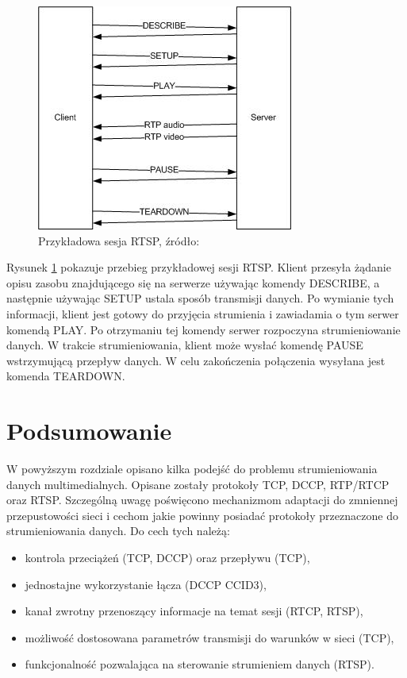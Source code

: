 \begin{figure}[h!]
	\centering
		\includegraphics{rtsp}
	\caption{Przykładowa sesja RTSP, źródło: \cite{rtsp-example}}
	\label{fig:rtsp}
\end{figure}

Rysunek \ref{fig:rtsp} pokazuje przebieg przykładowej sesji RTSP. Klient przesyła żądanie opisu zasobu znajdującego się na serwerze używając komendy DESCRIBE, a następnie używając SETUP ustala sposób transmisji danych. Po wymianie tych informacji, klient jest gotowy do przyjęcia strumienia i zawiadamia o tym serwer komendą PLAY. Po otrzymaniu tej komendy serwer rozpoczyna strumieniowanie danych. W trakcie strumieniowania, klient może wysłać komendę PAUSE wstrzymującą przepływ danych. W celu zakończenia połączenia wysyłana jest komenda TEARDOWN.

\section{Podsumowanie}

W powyższym rozdziale opisano kilka podejść do problemu strumieniowania danych multimedialnych. Opisane zostały protokoły TCP, DCCP, RTP/RTCP oraz RTSP. Szczególną uwagę poświęcono mechanizmom adaptacji do zmniennej przepustowości sieci i cechom jakie powinny posiadać protokoły przeznaczone do strumieniowania danych. Do cech tych należą:
\begin{itemize}
\item kontrola przeciążeń (TCP, DCCP) oraz przepływu (TCP),
\item jednostajne wykorzystanie łącza (DCCP CCID3),
\item kanał zwrotny przenoszący informacje na temat sesji (RTCP, RTSP),
\item możliwość dostosowana parametrów transmisji do warunków w sieci (TCP),
\item funkcjonalność pozwalająca na sterowanie strumieniem danych (RTSP).
\end{itemize}

